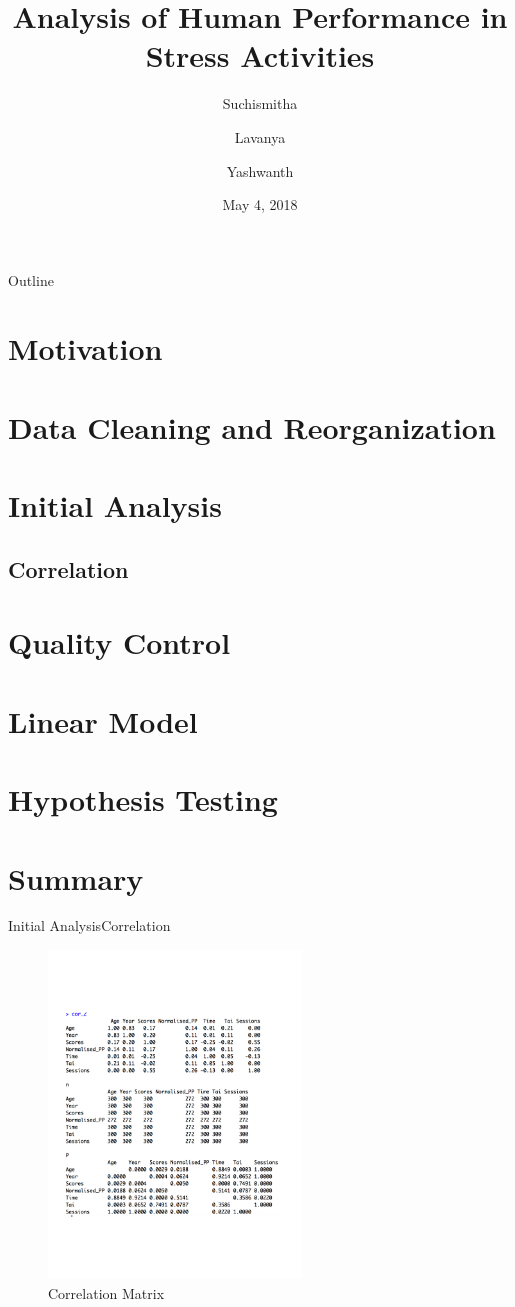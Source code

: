 \documentclass{beamer}
\title{Analysis of Human Performance in Stress Activities}
\author{Suchismitha\inst{1} \and Lavanya\inst{2}\and Yashwanth\inst{3}}
\date{May 4, 2018}
\begin{document}
\begin{frame}
  \titlepage
\end{frame}

\begin{frame}{Outline}
  \tableofcontents
\end{frame}

\section{Motivation}
\section{Data Cleaning and Reorganization}
\section{Initial Analysis}
\subsection{Correlation}
\section{Quality Control}
\section{Linear Model}
\section{Hypothesis Testing}
\section{Summary}


\begin{frame}{Initial Analysis}{Correlation}
  \begin{figure}
	\includegraphics[width=0.6\textwidth]{Correlation_Data.pdf}
	\caption{Correlation Matrix}
\end{figure} 
\end{frame}
\end{document}
